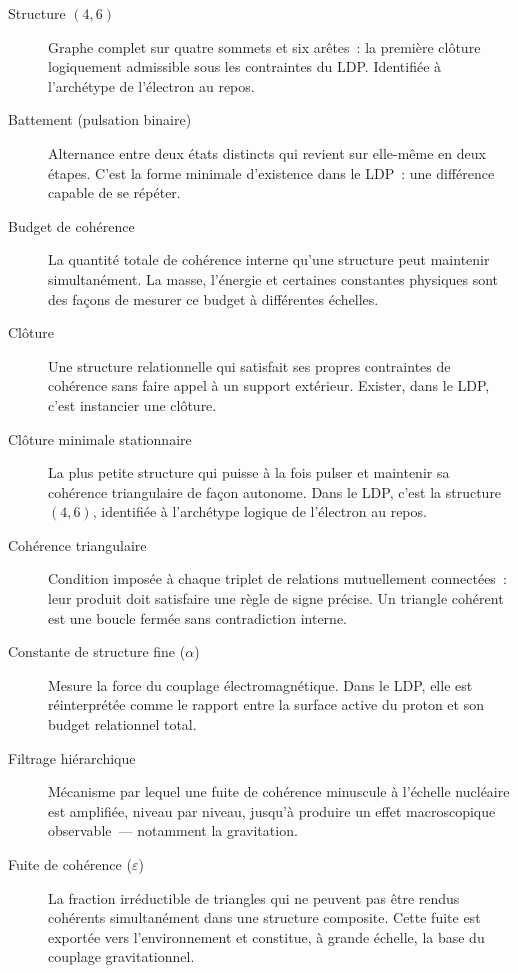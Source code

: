 \documentclass[12pt, a4paper, openright]{book}
\begin{document}
\begin{description}

\item[Structure $(4,6)$] Graphe complet sur quatre sommets et six arêtes~: la première clôture logiquement admissible sous les contraintes du LDP. Identifiée à l'archétype de l'électron au repos.

\item[Battement (pulsation binaire)] Alternance entre deux états distincts qui revient sur elle-même en deux étapes. C'est la forme minimale d'existence dans le LDP~: une différence capable de se répéter.

\item[Budget de cohérence] La quantité totale de cohérence interne qu'une structure peut maintenir simultanément. La masse, l'énergie et certaines constantes physiques sont des façons de mesurer ce budget à différentes échelles.

\item[Clôture] Une structure relationnelle qui satisfait ses propres contraintes de cohérence sans faire appel à un support extérieur. Exister, dans le LDP, c'est instancier une clôture.

\item[Clôture minimale stationnaire] La plus petite structure qui puisse à la fois pulser et maintenir sa cohérence triangulaire de façon autonome. Dans le LDP, c'est la structure $(4,6)$, identifiée à l'archétype logique de l'électron au repos.

\item[Cohérence triangulaire] Condition imposée à chaque triplet de relations mutuellement connectées~: leur produit doit satisfaire une règle de signe précise. Un triangle cohérent est une boucle fermée sans contradiction interne.

\item[Constante de structure fine ($\alpha$)] Mesure la force du couplage électromagnétique. Dans le LDP, elle est réinterprétée comme le rapport entre la surface active du proton et son budget relationnel total.

\item[Filtrage hiérarchique] Mécanisme par lequel une fuite de cohérence minuscule à l'échelle nucléaire est amplifiée, niveau par niveau, jusqu'à produire un effet macroscopique observable~--- notamment la gravitation.

\item[Fuite de cohérence ($\varepsilon$)] La fraction irréductible de triangles qui ne peuvent pas être rendus cohérents simultanément dans une structure composite. Cette fuite est exportée vers l'environnement et constitue, à grande échelle, la base du couplage gravitationnel.


\end{description}
\end{document}
